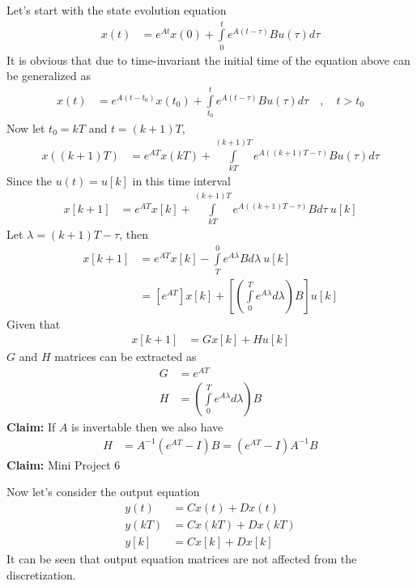 \documentclass[twoside]{article}
\begin{document}
Let's start with the state evolution equation
%
\begin{align*}
  x(t) &= e^{A t} x(0) + \int\limits_{0}^{t} e^{A ( t - \tau ) } B
         u(\tau) d \tau
\end{align*}
%
It is obvious that due to time-invariant the initial time of the 
equation above can be generalized as
%
\begin{align*}
  x(t) &= e^{A (t - t_0)} x(t_0) + \int\limits_{t_0}^{t} e^{A ( t - \tau ) } B
         u(\tau) d \tau \quad , \quad t > t_0
\end{align*}
%
Now let $t_0 = k T$ and $t = (k+1) T$,
%
\begin{align*}
  x( (k+1) T ) &= e^{A T} x(k T) + \int\limits_{kT}^{(k+1)T} e^{A ( (k+1)T - \tau ) } B
         u(\tau) d \tau 
\end{align*}
%
Since the $u(t) = u[k]$ in this time interval
%
\begin{align*}
  x[k+1] &= e^{A T} x[k] + \int\limits_{kT}^{(k+1)T} e^{A ( (k+1)T -
           \tau ) } B d \tau \ u[k]
\end{align*}
%
Let $\lambda = (k+1)T -\tau $, then
%
\begin{align*}
  x[k+1] &= e^{A T} x[k] - \int\limits_{T}^{0} e^{A \lambda } B d \lambda \ u[k]
\\
&= \left[ e^{A T} \right] x[k] + \left[\left( \int\limits_{0}^{T}
  e^{A \lambda } d \lambda \right) B \right] u[k]
\end{align*}
% 
Given that 
%
\begin{align*}
  x[k+1] &= G x[k] + H u[k]
\end{align*}
%
$G$ and $H$ matrices can be extracted as
%
\begin{align*}
  G &= e^{A T}
\\
 H &= \left( \int\limits_{0}^{T}
  e^{A \lambda } d \lambda \right) B
\end{align*}
%
\textbf{Claim:} If $A$ is invertable then we also have
%
\begin{align*}
 H &= A^{-1} \left( e^{AT} - I \right) B = \left( e^{AT} - I \right)
     A^{-1}  B  
\end{align*}
%
\textbf{Claim:} Mini Project 6

Now let's consider the output equation
%
%
\begin{align*}
  y(t) &= C x(t) + D x(t)
         \\
 y(k T) &= C x( k T) + D x( k T) 
\\
 y[k] &= C x[k] + D x[k] 
\end{align*}
%
It can be seen that output equation matrices are not affected from
the discretization.
\end{document}
